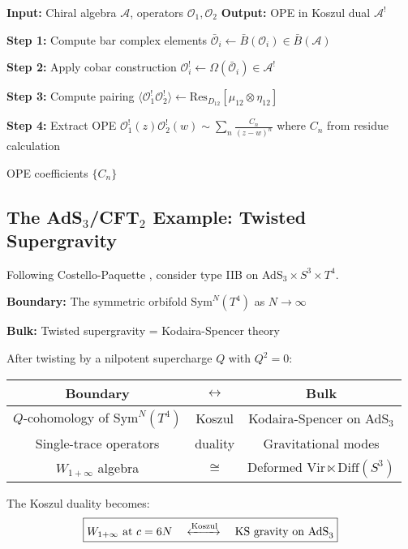 \begin{algorithm}\label{alg:koszul-ope}
\begin{algorithmic}
\STATE \textbf{Input:} Chiral algebra $\mathcal{A}$, operators $\mathcal{O}_1, \mathcal{O}_2$
\STATE \textbf{Output:} OPE in Koszul dual $\mathcal{A}^!$

\STATE \textbf{Step 1:} Compute bar complex elements
\STATE $\bar{\mathcal{O}}_i \gets \bar{B}(\mathcal{O}_i) \in \bar{B}(\mathcal{A})$

\STATE \textbf{Step 2:} Apply cobar construction
\STATE $\mathcal{O}_i^! \gets \Omega(\bar{\mathcal{O}}_i) \in \mathcal{A}^!$

\STATE \textbf{Step 3:} Compute pairing
\STATE $\langle \mathcal{O}_1^! \mathcal{O}_2^! \rangle \gets \text{Res}_{D_{12}}[\mu_{12} \otimes \eta_{12}]$

\STATE \textbf{Step 4:} Extract OPE
\STATE $\mathcal{O}_1^!(z) \mathcal{O}_2^!(w) \sim \sum_n \frac{C_n}{(z-w)^n}$
\STATE where $C_n$ from residue calculation

\RETURN OPE coefficients $\{C_n\}$
\end{algorithmic}
\end{algorithm}

\subsection{The AdS$_3$/CFT$_2$ Example: Twisted Supergravity}

\begin{example}\label{ex:AdS3}
Following Costello-Paquette \cite{CP2020}, consider type IIB on AdS$_3 \times S^3 \times T^4$.

\textbf{Boundary:} The symmetric orbifold $\text{Sym}^N(T^4)$ as $N \to \infty$

\textbf{Bulk:} Twisted supergravity = Kodaira-Spencer theory

After twisting by a nilpotent supercharge $Q$ with $Q^2 = 0$:

\begin{center}
\begin{tabular}{|c|c|c|}
\hline
\textbf{Boundary} & $\leftrightarrow$ & \textbf{Bulk} \\
\hline
$Q$-cohomology of $\text{Sym}^N(T^4)$ & Koszul & Kodaira-Spencer on AdS$_3$ \\
Single-trace operators & duality & Gravitational modes \\
$W_{1+\infty}$ algebra & $\cong$ & Deformed $\text{Vir} \ltimes \text{Diff}(S^3)$ \\
\hline
\end{tabular}
\end{center}

The Koszul duality becomes:
$$\boxed{W_{1+\infty} \text{ at } c = 6N \quad \xleftrightarrow{\text{Koszul}} \quad \text{KS gravity on AdS}_3}$$
\end{example}

